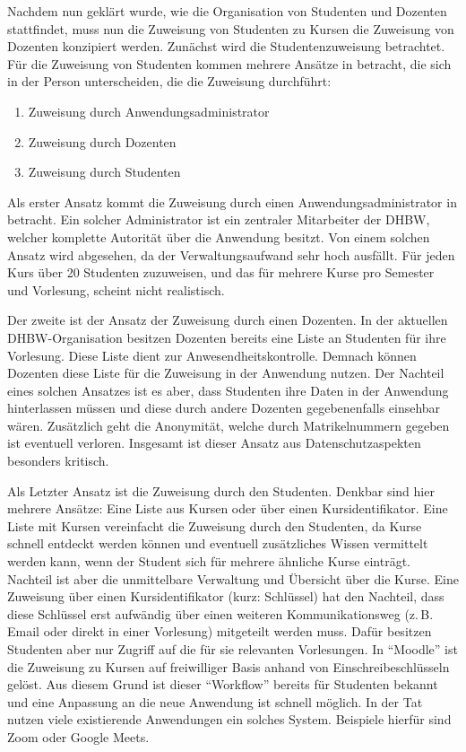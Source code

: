 Nachdem nun geklärt wurde, wie die Organisation von Studenten und Dozenten stattfindet, muss nun die Zuweisung von Studenten zu Kursen die Zuweisung von Dozenten konzipiert werden.
Zunächst wird die Studentenzuweisung betrachtet.
Für die Zuweisung von Studenten kommen mehrere Ansätze in betracht, die sich in der Person unterscheiden, die die Zuweisung durchführt:
\begin{enumerate}
    \item Zuweisung durch Anwendungsadministrator
    \item Zuweisung durch Dozenten
    \item Zuweisung durch Studenten
\end{enumerate}
Als erster Ansatz kommt die Zuweisung durch einen Anwendungsadministrator in betracht.
Ein solcher Administrator ist ein zentraler Mitarbeiter der DHBW, welcher komplette Autorität über die Anwendung besitzt.
Von einem solchen Ansatz wird abgesehen, da der Verwaltungsaufwand sehr hoch ausfällt.
Für jeden Kurs über 20 Studenten zuzuweisen, und das für mehrere Kurse pro Semester und Vorlesung, scheint nicht realistisch.

Der zweite ist der Ansatz der Zuweisung durch einen Dozenten.
In der aktuellen DHBW-Organisation besitzen Dozenten bereits eine Liste an Studenten für ihre Vorlesung.
Diese Liste dient zur Anwesendheitskontrolle.
Demnach können Dozenten diese Liste für die Zuweisung in der Anwendung nutzen.
Der Nachteil eines solchen Ansatzes ist es aber, dass Studenten ihre Daten in der Anwendung hinterlassen müssen und diese durch andere Dozenten gegebenenfalls einsehbar wären.
Zusätzlich geht die Anonymität, welche durch Matrikelnummern gegeben ist eventuell verloren.
Insgesamt ist dieser Ansatz aus Datenschutzaspekten besonders kritisch. %

Als Letzter Ansatz ist die Zuweisung durch den Studenten.
Denkbar sind hier mehrere Ansätze: Eine Liste aus Kursen oder über einen Kursidentifikator.
Eine Liste mit Kursen vereinfacht die Zuweisung durch den Studenten, da Kurse schnell entdeckt werden können und eventuell zusätzliches Wissen vermittelt werden kann, wenn der Student sich für mehrere ähnliche Kurse einträgt.
Nachteil ist aber die unmittelbare Verwaltung und Übersicht über die Kurse.
Eine Zuweisung über einen Kursidentifikator (kurz: Schlüssel) hat den Nachteil, dass diese Schlüssel erst aufwändig über einen weiteren Kommunikationsweg (z.\,B. Email oder direkt in einer Vorlesung) mitgeteilt werden muss.
Dafür besitzen Studenten aber nur Zugriff auf die für sie relevanten Vorlesungen.
In \enquote{Moodle} ist die Zuweisung zu Kursen auf freiwilliger Basis anhand von Einschreibeschlüsseln gelöst.
Aus diesem Grund ist dieser \enquote{Workflow} bereits für Studenten bekannt und eine Anpassung an die neue Anwendung ist schnell möglich.
In der Tat nutzen viele existierende Anwendungen ein solches System.
Beispiele hierfür sind Zoom oder Google Meets.


